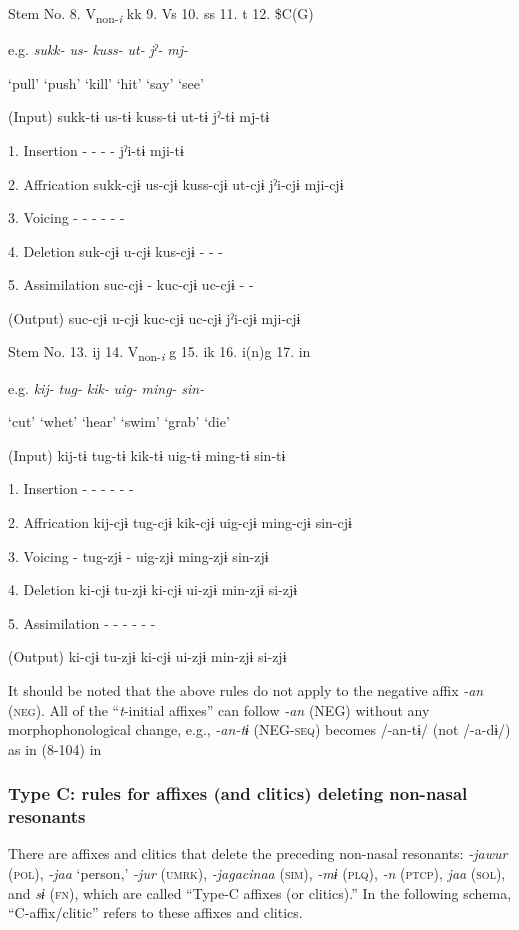   Stem No.  8. V\textsubscript{non-}\textit{\textsubscript{i} }kk  9. Vs  10. ss  11. t  12. \$C(G)

  e.g.  \textit{sukk-}  \textit{us-}  \textit{kuss-}  \textit{ut-}  \textit{jˀ-}  \textit{mj-}

    ‘pull’  ‘push’  ‘kill’  ‘hit’  ‘say’  ‘see’

  (Input)  sukk-tɨ  us-tɨ  kuss-tɨ  ut-tɨ  jˀ-tɨ  mj-tɨ

1.  Insertion  {}-  {}-  {}-  {}-  jˀi-tɨ  mji-tɨ

2.  Affrication  sukk-cjɨ  us-cjɨ  kuss-cjɨ  ut-cjɨ  jˀi-cjɨ  mji-cjɨ

3.  Voicing  {}-  {}-  {}-  {}-  {}-  {}-

4.  Deletion  suk-cjɨ  u-cjɨ  kus-cjɨ  {}-  {}-  {}-

5.  Assimilation  suc-cjɨ  {}-  kuc-cjɨ  uc-cjɨ  {}-  {}-

  (Output)  suc-cjɨ  u-cjɨ  kuc-cjɨ  uc-cjɨ  jˀi-cjɨ  mji-cjɨ

  Stem No.  13. ij  14. V\textsubscript{non-}\textit{\textsubscript{i}} g  15. ik  16. i(n)g    17. in

  e.g.  \textit{kij-}  \textit{tug-}  \textit{kik-}  \textit{uig-}  \textit{ming-}  \textit{sin-}

    ‘cut’  ‘whet’  ‘hear’  ‘swim’  ‘grab’  ‘die’

  (Input)  kij-tɨ  tug-tɨ  kik-tɨ  uig-tɨ  ming-tɨ  sin-tɨ

1.  Insertion  {}-  {}-  {}-  {}-  {}-  {}-

2.  Affrication  kij-cjɨ  tug-cjɨ  kik-cjɨ  uig-cjɨ  ming-cjɨ  sin-cjɨ

3.  Voicing  {}-  tug-zjɨ  {}-  uig-zjɨ  ming-zjɨ  sin-zjɨ

4.  Deletion  ki-cjɨ  tu-zjɨ  ki-cjɨ  ui-zjɨ  min-zjɨ  si-zjɨ

5.  Assimilation  {}-  {}-  {}-  {}-  {}-  {}-

  (Output)  ki-cjɨ  tu-zjɨ  ki-cjɨ  ui-zjɨ  min-zjɨ  si-zjɨ

It should be noted that the above rules do not apply to the negative affix \textit{{}-an} (\textsc{neg}). All of the “\textit{t}{}-initial affixes” can follow \textit{{}-an} (NEG) without any morphophonological change, e.g., \textit{{}-an-tɨ} (NEG-\textsc{seq}) becomes /-an-tɨ/ (not /-a-dɨ/) as in (8-104) in 

\subsubsection{Type C: rules for affixes (and clitics) deleting non-nasal resonants}
\label{bkm:Ref347177215}
There are affixes and clitics that delete the preceding non-nasal resonants: \textit{{}-jawur} (\textsc{pol}), \textit{{}-jaa} ‘person,’ \textit{{}-jur} (\textsc{umrk}), \textit{{}-jagacinaa} (\textsc{sim}), \textit{{}-mɨ} (\textsc{plq}), \textit{{}-n} (\textsc{ptcp}), \textit{jaa} (\textsc{sol}), and \textit{sɨ} (\textsc{fn}), which are called “Type-C affixes (or clitics).” In the following schema, “C-affix/clitic” refers to these affixes and clitics.

